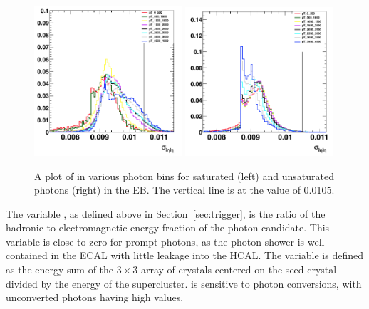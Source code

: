 \begin{figure}[!htbp]
	\centering
	\includegraphics[width=0.49\textwidth]{figures/sieie_sat_old}
	\includegraphics[width=0.49\textwidth]{figures/sieie_notSat_old}
	\caption{A plot of \sieie in various photon \pt bins for saturated (left) and unsaturated photons (right) in the EB. The vertical line is at the value of 0.0105.}
	\label{fig:sieie_sat}
\end{figure}

The variable \hoe, as defined above in Section~\ref{sec:trigger}, is the ratio of the hadronic to electromagnetic energy fraction of the photon candidate. This variable is close to zero for prompt photons, as the photon shower is well contained in the ECAL with little leakage into the HCAL. The \rnine variable is defined as the energy sum of the $3{\times}3$ array of crystals centered on the seed crystal divided by the energy of the supercluster. \rnine is sensitive to photon conversions, with unconverted photons having high values.

